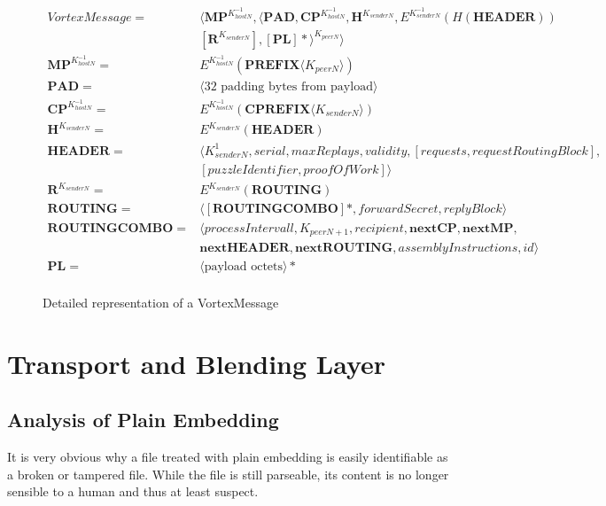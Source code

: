 \begin{figure}[!h]
	\begin{align}
	VortexMessage                = &\langle \mathbf{MP}^{K^{-1}_{hostN}}, \langle\mathbf{PAD}, \mathbf{CP}^{K^{-1}_{hostN}}, \mathbf{H}^{K_{senderN}}, E^{K^{-1}_{senderN}}\left(H\left(\mathbf{HEADER}\right)\right)  \nonumber \\
	& \left[\mathbf{R}^{K_{senderN}}\right], \left[\mathbf{PL}\right]*\rangle^{K_{peerN}} \rangle\label{eq:vortexMessage}\\ 
	\mathbf{MP}^{K^{-1}_{hostN}}  = &E^{K^{-1}_{hostN}}\left(\mathbf{PREFIX}\langle K_{peerN}\rangle \right)\\ 
	\mathbf{PAD}                 = &\langle \text{32 padding bytes from payload} \rangle\\ 
	\mathbf{CP}^{K^{-1}_{hostN}} = &E^{K^{-1}_{hostN}}\left(\mathbf{CPREFIX}\langle K_{senderN}\rangle \right)\\ 
	\mathbf{H}^{K_{senderN}}     = &E^{K_{senderN}}\left(\mathbf{HEADER}\right)\\  
	\mathbf{HEADER}              = &\langle K^{1}_{senderN}, serial, maxReplays, validity, [requests, requestRoutingBlock],\nonumber\\ 
	& [puzzleIdentifier, proofOfWork] \rangle \\  
	\mathbf{R}^{K_{senderN}}     = & E^{K_{senderN}}\left(\mathbf{ROUTING}\right)\\ 
	\mathbf{ROUTING}             = & \langle [ \mathbf{ROUTINGCOMBO} ] *, forwardSecret, replyBlock \rangle\\  
	\mathbf{ROUTINGCOMBO}        = & \langle processIntervall, K_{peerN+1}, recipient, \mathbf{nextCP}, \mathbf{nextMP}, \nonumber \\
	& \mathbf{nextHEADER}, \mathbf{nextROUTING}, assemblyInstructions, id \rangle\\
	\mathbf{PL}                  = &\langle \text{payload octets} \rangle *\\ 
	\end{align}
	\caption{Detailed representation of a VortexMessage}
\end{figure}

\section{Transport and Blending Layer}

\subsection{Analysis of Plain Embedding}
It is very obvious why a file treated with plain embedding is easily identifiable as a broken or tampered file. While the file is still parseable, its content is no longer sensible to a human and thus at least suspect. 

